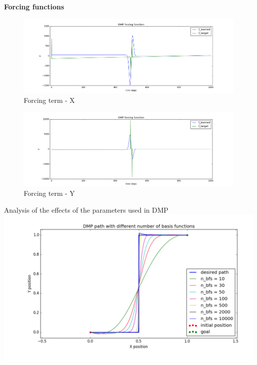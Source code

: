 \documentclass{beamer}
\begin{document}
	\begin{frame}
		\textbf{Forcing functions}
		\begin{figure}
			\includegraphics[scale=0.23]{images/f_x}
			\caption{Forcing term - X}
		\end{figure}

		\begin{figure}
			\includegraphics[scale=0.23]{images/f_y}
			\caption{Forcing term - Y}
		\end{figure}
	\end{frame}
	
	\begin{frame}{Analysis of the effects of the parameters used in DMP}
		\includegraphics[width=\textwidth]{images/n_bfs_}
	\end{frame}
	
\end{document}
